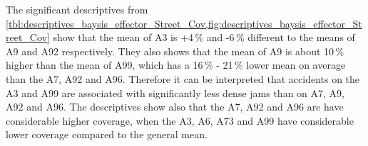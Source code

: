 The significant descriptives from \cref{tbl:descriptives_baysis_effector_Street_Cov,fig:descriptives_baysis_effector_Street_Cov} show that the mean of A3 is +4\,\% and -6\,\% different to the means of A9 and A92 respectively. They also shows that the mean of A9 is about 10\,\% higher than the mean of A99, which has a 16\,\% - 21\,\% lower mean on average than the A7, A92 and A96. Therefore it can be interpreted that accidents on the A3 and A99 are associated with significantly less dense jams than on A7, A9, A92 and A96. The descriptives show also that the A7, A92 and A96 are have considerable higher coverage, when the A3, A6, A73 and A99 have considerable lower coverage compared to the general mean.








 

